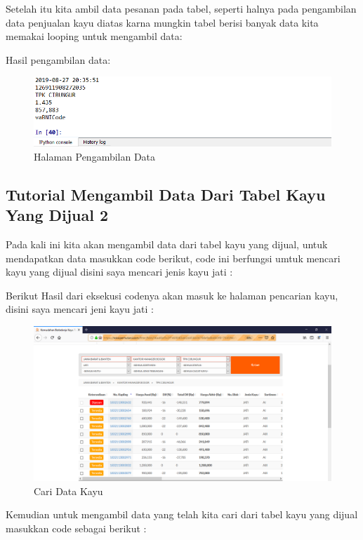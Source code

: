 Setelah itu kita ambil data pesanan pada tabel, seperti halnya pada pengambilan data penjualan kayu diatas karna mungkin tabel berisi banyak data kita memakai looping untuk mengambil data:

\newpage
Hasil pengambilan data:
\begin{figure}[h]
	\centering
	\includegraphics[scale=0.55]{figures/8datapesan}
	\caption{Halaman Pengambilan Data}
\end{figure}


\newpage
\subsection{Tutorial Mengambil Data Dari Tabel Kayu Yang Dijual 2}
Pada kali ini kita akan mengambil data dari tabel kayu yang dijual, untuk mendapatkan data masukkan code berikut, code ini berfungsi umtuk mencari kayu yang dijual disini saya mencari jenis kayu jati :


Berikut Hasil dari eksekusi codenya akan masuk ke halaman pencarian kayu, disini saya mencari jeni kayu jati  :
\begin{figure}[h]
	\centering
	\includegraphics[scale=0.3]{figures/caridatakayu}
	\caption{Cari Data Kayu}
\end{figure}

Kemudian untuk mengambil data yang telah kita cari dari tabel kayu yang dijual masukkan code sebagai berikut :


